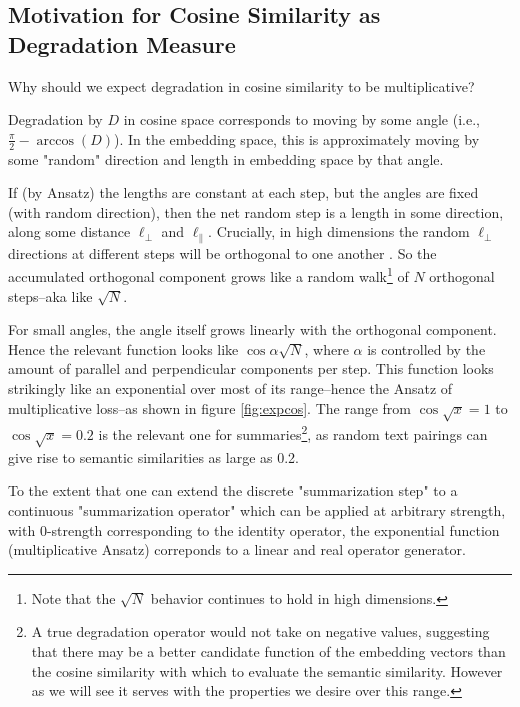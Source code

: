 \documentclass{article}
\begin{document}
\subsection{Motivation for Cosine Similarity as Degradation Measure}

Why should we expect degradation in cosine similarity to be multiplicative?

Degradation by $D$ in cosine space corresponds to moving by some angle (i.e., $\frac{\pi}{2}-\arccos(D)$). 
In the embedding space, this is approximately moving by some "random" direction and length in embedding space by that angle.

If (by Ansatz) the lengths are constant at each step, but the angles are fixed (with random direction), then the net random step is a length in some direction, along some distance $\ell_{\perp}$ and $\ell_{\parallel}$.
Crucially, in high dimensions the random $\ell_{\perp}$ directions at different steps will be orthogonal to one another \citep{randomwalk}. 
So the accumulated orthogonal component grows like a random walk\footnote{Note that the $\sqrt{N}$ behavior continues to hold in high dimensions.} of $N$ orthogonal steps--aka like $\sqrt{N}$.  

For small angles, the angle itself grows linearly with the orthogonal component.
Hence the relevant function looks like $\cos{\alpha \sqrt{N}}$, where $\alpha$ is controlled by the amount of parallel and perpendicular components per step.
This function looks strikingly like an exponential over most of its range--hence the Ansatz of multiplicative loss--as shown in figure \ref{fig:expcos}.
The range from $\cos \sqrt{x}=1$ to $\cos \sqrt{x} = 0.2$ is the relevant one for summaries\footnote{A true degradation operator would not take on negative values, suggesting that there may be a better candidate function of the embedding vectors than the cosine similarity with which to evaluate the semantic similarity.  However as we will see it serves with the properties we desire over this range.}, as random text pairings can give rise to semantic similarities as large as 0.2.

To the extent that one can extend the discrete "summarization step" to a continuous "summarization operator" which can be applied at arbitrary strength, with 0-strength corresponding to the identity operator, the exponential function (multiplicative Ansatz) correponds to a linear and real operator generator.
\end{document}
